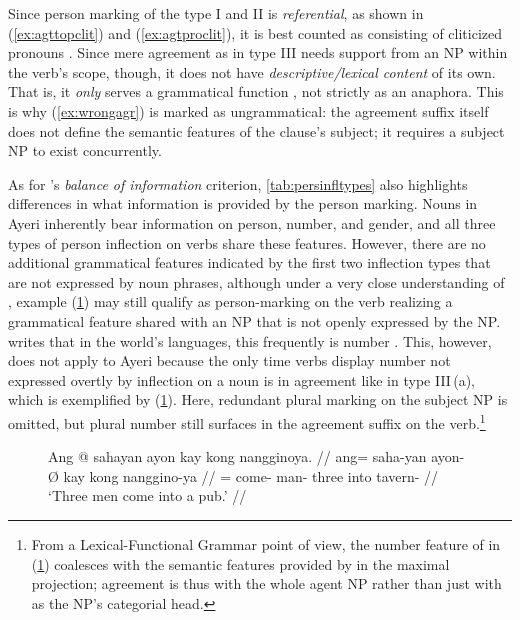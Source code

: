 Since person marking of the type I and II is \emph{referential}, as shown in
(\ref{ex:agttopclit}) and (\ref{ex:agtproclit}), it is best counted as
consisting of cliticized pronouns \citep[103]{corbett2006}. Since mere
agreement as in type III needs support from an NP within the verb's scope,
though, it does not have \emph{descriptive/lexical content} of its own. That
is, it \emph{only} serves a grammatical function \citep[104]{corbett2006}, not
strictly as an anaphora. This is why (\ref{ex:wrongagr}) is marked as
ungrammatical: the agreement suffix  itself does not define the
semantic features of the clause's subject; it requires a subject NP to exist
concurrently.

As for \citet{corbett2006}'s \emph{balance of information} criterion,
\autoref{tab:persinfltypes} also highlights differences in what information is
provided by the person marking. Nouns in Ayeri inherently bear information on
person, number, and gender, and all three types of person inflection on verbs
share these features. However, there are no additional grammatical features
indicated by the first two inflection types that are not expressed by noun
phrases, although under a very close understanding of \citet{corbett2006},
example (\ref{ex:verbplagr}) may still qualify as person-marking on the verb
realizing a grammatical feature shared with an NP that is not openly expressed
by the NP. \citet{corbett2006} writes that in the world's languages, this
frequently is number \citep[105]{corbett2006}. This, however, does not apply to
Ayeri because the only time verbs display number not expressed overtly by
inflection on a noun is in agreement like in type III\,(a), which is
exemplified by (\ref{ex:verbplagr}). Here, redundant plural marking on the
subject NP is omitted, but plural number still surfaces in the agreement suffix
on the verb.\footnote{From a Lexical-Functional Grammar point of view, the
number feature of  in (\ref{ex:verbplagr}) coalesces with the
semantic features provided by  in the maximal projection;
agreement is thus with the whole agent NP rather than just with
 as the NP's categorial head.}

\begin{figure}[h]
\ex\label{ex:verbplagr} %
\begingl
	\gla Ang @ sahayan ayon kay kong nangginoya. //
	\glb ang= saha-yan ayon-Ø kay kong nanggino-ya //
	\glc \AgtT{}= come-\TplM{} man-\Top{} three into tavern-\Loc{} //
	\glft `Three men come into a pub.' //
\endgl\xe
\end{figure}

